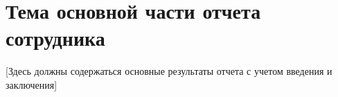 \chapter{Тема основной части отчета сотрудника}

[Здесь должны содержаться основные результаты отчета с учетом введения и заключения]